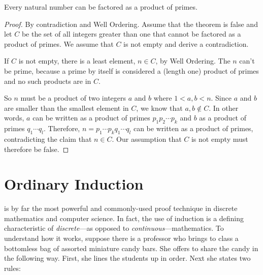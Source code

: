\begin{theorem}\label{factor_into_primes}
Every natural number can be factored as a product of primes.
\end{theorem}
\begin{proof}
By contradiction and Well Ordering.  Assume that the theorem is false
and let $C$ be the set of all integers greater than one that cannot be
factored as a product of primes.  We assume that $C$ is not empty and derive a
contradiction.

If $C$ is not empty, there is a least element, $n \in C$, by Well
Ordering.  The $n$ can't be prime, because a prime by itself is considered
a (length one) product of primes and no such products are in $C$.

So $n$ must be a product of two integers $a$ and $b$ where $1<a,b<n$.
Since $a$ and $b$ are smaller than the smallest element in $C$, we know
that $a,b \notin C$.  In other words, $a$ can be written as a product of
primes $p_1p_2\cdots p_k$ and $b$ as a product of primes $q_1\cdots q_l$.
Therefore, $n=p_1\cdots p_k q_1 \cdots q_l$ can be written as a product of
primes, contradicting the claim that $n \in C$.  Our assumption that
$C$ is not empty must therefore be false.
\end{proof}

\begin{problems}
\practiceproblems
\pinput\iffalse[title = {Postage by Well Ordering}]\fi{TP_10_and_15_cent_stamps_by_WOP}

\classproblems
{}

\homeworkproblems
{}
\end{problems}

\section{Ordinary Induction}

 is by far the most powerful and commonly-used proof technique in
discrete mathematics and computer science.  In fact, the use of induction
is a defining characteristic of \emph{discrete}---as opposed to
\emph{continuous}---mathematics.
%
To understand how it works, suppose there is a professor who brings
to class a bottomless bag of assorted miniature candy bars.  She offers to
share the candy in the following way.  First, she lines the students up in
order.  Next she states two rules:

